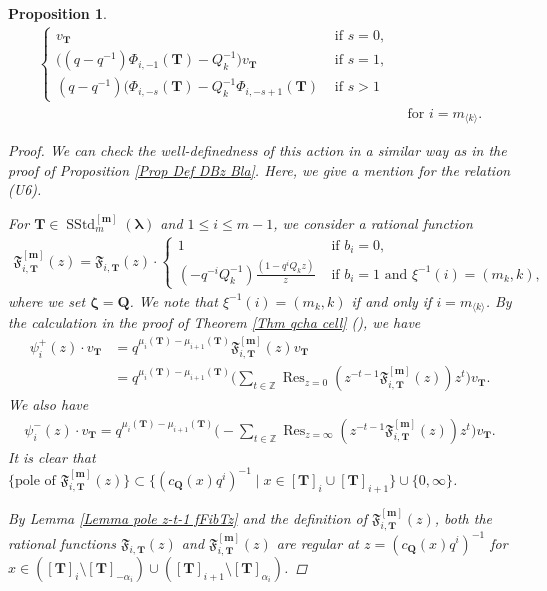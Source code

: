 \documentclass[12pt]{amsart}
\newtheorem{prop}[thm]{Proposition}
\numberwithin{equation}{thm}
\newcommand\ZZ{\mathbb Z}
\newcommand\bQ{\mathbf Q}
\newcommand\bT{\mathbf T}
\renewcommand\bm{\mathbf m} %
\newcommand\fF{\mathfrak F}
\renewcommand\a{\alpha}  %
\newcommand\Bz{\boldsymbol\zeta}
\newcommand\Bla{\boldsymbol\lambda}
\newcommand{\dis}{\displaystyle}
\newcommand\lan{\langle}
\newcommand\ran{\rangle}
\newcommand\Res{\operatorname{Res}}
\newcommand{\SStd}{\operatorname{SStd}}
\newcounter{ichi}
\newcommand{\roi}{\roman{ichi}}
\newcounter{ni}
\begin{document}
\begin{prop}
\begin{align*}
\begin{cases}
		v_{\bT} 
			& \text{ if } s=0,  
		\\ 
		\big( (q-q^{-1}) \Phi_{i, -1} (\bT) - Q_k^{-1} \big) v_{\bT} 
			& \text{ if } s=1, 
		\\ 
		(q-q^{-1}) \big( \Phi_{i,-s} (\bT) - Q_k^{-1} \Phi_{i, - s+1} (\bT) 
			& \text{ if } s>1
	\end{cases}
	\\ & \text{ for } i = m_{\lan k \ran}. 
\end{align*}
\begin{proof}
We can check the well-definedness of this action in a similar way as in the proof of Proposition \ref{Prop Def DBz Bla}.
Here, we give a mention for the relation (U6). 

For $\bT \in \SStd_m^{[\bm]}(\Bla)$ and $1 \leq i \leq m-1$, 
we consider a rational function  
\begin{align*}
\fF_{i,\bT}^{[\bm]} (z) 
= \fF_{i,\bT}(z) \cdot 
	\begin{cases}
	1 & \text{ if } b_i=0, 
	\\ \dis 
	(- q^{-i} Q_k^{-1}) \frac{(1 - q^i Q_k z)}{z}
		& \text{ if } b_i=1 \text{ and } \xi^{-1} (i)=(m_k,k),
	\end{cases}
\end{align*}
where we set $\Bz = \bQ$. 
We note that $\xi^{-1} (i) = (m_k,k)$ if and only if $i=m_{\lan k \ran}$. 
By the calculation in the proof of Theorem \ref{Thm qcha cell} (\roi), 
we have 
\begin{align*}
\psi_i^+(z) \cdot v_{\bT} 
&= q^{\mu_i(\bT) - \mu_{i+1} (\bT)} \fF_{i,\bT}^{[\bm]} (z) v_{\bT}
\\
&= q^{\mu_i(\bT) - \mu_{i+1} (\bT)} \big( \sum_{t \in \ZZ} \Res_{z=0} (z^{-t-1} \fF_{i, \bT}^{[\bm]}(z)) z^t \big) v_{\bT}.
\end{align*}
We also have 
\begin{align*}
\psi_i^-(z) \cdot v_{\bT} = q^{\mu_i(\bT) - \mu_{i+1} (\bT)} 
	\big( - \sum_{t \in \ZZ} \Res_{z=\infty} (z^{-t-1} \fF_{i,\bT}^{[\bm]}(z)) z^t\big) v_{\bT}. 
\end{align*}
It is clear that 
$\{ \text{pole of } \fF_{i, \bT}^{[\bm]} (z)\} \subset \{(c_{\bQ} (x) q^i)^{-1} \mid x \in [\bT]_i \cup [\bT]_{i+1}\} \cup \{0 , \infty\}$. 

By Lemma \ref{Lemma pole z-t-1 fFibTz} and the definition of $\fF_{i,\bT}^{[\bm]}(z)$, 
both the rational functions $\fF_{i, \bT}(z)$ and  $\fF_{i,\bT}^{[\bm]} (z)$ are regular at $z= (c_{\bQ}(x)q^i)^{-1}$ for 
$x \in ([\bT]_i \setminus [\bT]_{-\a_i}) \cup ([\bT]_{i+1} \setminus [\bT]_{\a_i})$. 


\end{proof}
\end{prop}
\end{document}
